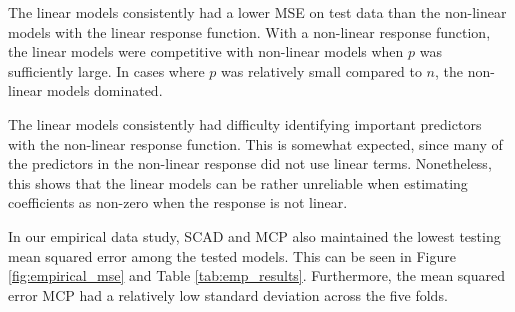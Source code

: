 \documentclass{article}
\begin{document}
	The linear models consistently had a lower MSE on test data than the non-linear models with the linear response function. With a non-linear response function, the linear models were competitive with non-linear models when $p$ was sufficiently large. In cases where $p$ was relatively small compared to $n$, the non-linear models dominated.
	
	The linear models consistently had difficulty identifying important predictors with the non-linear response function. This is somewhat expected, since many of the predictors in the non-linear response did not use linear terms. Nonetheless, this shows that the linear models can be rather unreliable when estimating coefficients as non-zero when the response is not linear.
	

	
	In our empirical data study, SCAD and MCP also maintained the lowest testing mean squared error among the tested models. This can be seen in Figure \ref{fig:empirical_mse} and Table \ref{tab:emp_results}. Furthermore, the mean squared error MCP had a relatively low standard deviation across the five folds. 

	
\end{document}
